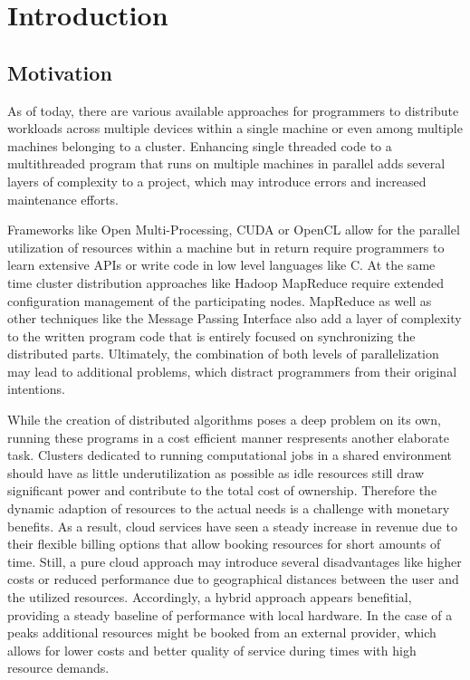 \chapter{Introduction}

\section{Motivation}

As of today, there are various available approaches for programmers to distribute workloads across multiple devices within a single machine or even among multiple machines belonging to a cluster. Enhancing single threaded code to a multithreaded program that runs on multiple machines in parallel adds several layers of complexity to a project, which may introduce errors and increased maintenance efforts.

Frameworks like Open Multi-Processing, CUDA or OpenCL allow for the parallel utilization of resources within a machine but in return require programmers to learn extensive APIs or write code in low level languages like C.
At the same time cluster distribution approaches like Hadoop MapReduce require extended configuration management of the participating nodes. MapReduce as well as other techniques like the Message Passing Interface also add a layer of complexity to the written program code that is entirely focused on synchronizing the distributed parts.
Ultimately, the combination of both levels of parallelization may lead to additional problems, which distract programmers from their original intentions.

While the creation of distributed algorithms poses a deep problem on its own, running these programs in a cost efficient manner respresents another elaborate task. Clusters dedicated to running computational jobs in a shared environment should have as little underutilization as possible as idle resources still draw significant power and contribute to the total cost of ownership. Therefore the dynamic adaption of resources to the actual needs is a challenge with monetary benefits. As a result, cloud services have seen a steady increase in revenue due to their flexible billing options that allow booking resources for short amounts of time. Still, a pure cloud approach may introduce several disadvantages like higher costs or reduced performance due to geographical distances between the user and the utilized resources. Accordingly, a hybrid approach appears benefitial, providing a steady baseline of performance with local hardware. In the case of a peaks additional resources might be booked from an external provider, which allows for lower costs and better quality of service during times with high resource demands.

